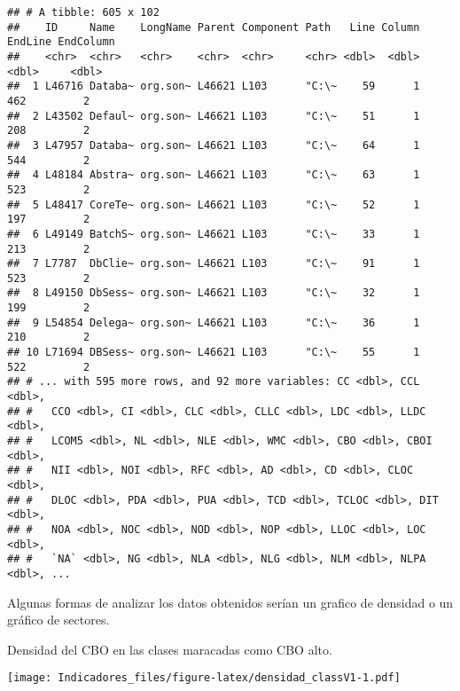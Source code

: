 \documentclass[
]{article}
\newenvironment{Shaded}{\begin{snugshade}}{\end{snugshade}}
\newcommand{\AttributeTok}[1]{\textcolor[rgb]{0.77,0.63,0.00}{#1}}
\newcommand{\FunctionTok}[1]{\textcolor[rgb]{0.00,0.00,0.00}{#1}}
\newcommand{\NormalTok}[1]{#1}
\newcommand{\SpecialCharTok}[1]{\textcolor[rgb]{0.00,0.00,0.00}{#1}}
\newcommand{\StringTok}[1]{\textcolor[rgb]{0.31,0.60,0.02}{#1}}
\begin{document}
\begin{verbatim}
## # A tibble: 605 x 102
##    ID     Name    LongName Parent Component Path   Line Column EndLine EndColumn
##    <chr>  <chr>   <chr>    <chr>  <chr>     <chr> <dbl>  <dbl>   <dbl>     <dbl>
##  1 L46716 Databa~ org.son~ L46621 L103      "C:\~    59      1     462         2
##  2 L43502 Defaul~ org.son~ L46621 L103      "C:\~    51      1     208         2
##  3 L47957 Databa~ org.son~ L46621 L103      "C:\~    64      1     544         2
##  4 L48184 Abstra~ org.son~ L46621 L103      "C:\~    63      1     523         2
##  5 L48417 CoreTe~ org.son~ L46621 L103      "C:\~    52      1     197         2
##  6 L49149 BatchS~ org.son~ L46621 L103      "C:\~    33      1     213         2
##  7 L7787  DbClie~ org.son~ L46621 L103      "C:\~    91      1     523         2
##  8 L49150 DbSess~ org.son~ L46621 L103      "C:\~    32      1     199         2
##  9 L54854 Delega~ org.son~ L46621 L103      "C:\~    36      1     210         2
## 10 L71694 DBSess~ org.son~ L46621 L103      "C:\~    55      1     522         2
## # ... with 595 more rows, and 92 more variables: CC <dbl>, CCL <dbl>,
## #   CCO <dbl>, CI <dbl>, CLC <dbl>, CLLC <dbl>, LDC <dbl>, LLDC <dbl>,
## #   LCOM5 <dbl>, NL <dbl>, NLE <dbl>, WMC <dbl>, CBO <dbl>, CBOI <dbl>,
## #   NII <dbl>, NOI <dbl>, RFC <dbl>, AD <dbl>, CD <dbl>, CLOC <dbl>,
## #   DLOC <dbl>, PDA <dbl>, PUA <dbl>, TCD <dbl>, TCLOC <dbl>, DIT <dbl>,
## #   NOA <dbl>, NOC <dbl>, NOD <dbl>, NOP <dbl>, LLOC <dbl>, LOC <dbl>,
## #   `NA` <dbl>, NG <dbl>, NLA <dbl>, NLG <dbl>, NLM <dbl>, NLPA <dbl>, ...
\end{verbatim}

Algunas formas de analizar los datos obtenidos serían un grafico de
densidad o un gráfico de sectores.

Densidad del CBO en las clases maracadas como CBO alto.

\begin{Shaded}
\end{Shaded}

\texttt{[image: Indicadores\_files/figure-latex/densidad\_classV1-1.pdf]}
\end{document}
